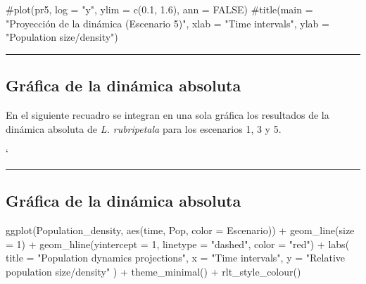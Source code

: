 \documentclass[
  12pt,
  letterpaper,
]{book}
\newenvironment{Shaded}{\begin{snugshade}}{\end{snugshade}}
\newcommand{\AttributeTok}[1]{\textcolor[rgb]{0.40,0.45,0.13}{#1}}
\newcommand{\CommentTok}[1]{\textcolor[rgb]{0.37,0.37,0.37}{#1}}
\newcommand{\DecValTok}[1]{\textcolor[rgb]{0.68,0.00,0.00}{#1}}
\newcommand{\FunctionTok}[1]{\textcolor[rgb]{0.28,0.35,0.67}{#1}}
\newcommand{\NormalTok}[1]{\textcolor[rgb]{0.00,0.23,0.31}{#1}}
\newcommand{\SpecialCharTok}[1]{\textcolor[rgb]{0.37,0.37,0.37}{#1}}
\newcommand{\StringTok}[1]{\textcolor[rgb]{0.13,0.47,0.30}{#1}}
\begin{document}
\begin{Shaded}
\begin{Highlighting}[]
\CommentTok{\#plot(pr5, log = "y", ylim = c(0.1, 1.6), ann = FALSE)}
\CommentTok{\#title(main = "Proyección de la dinámica (Escenario 5)", xlab = "Time intervals", ylab = "Population size/density")}
\end{Highlighting}
\end{Shaded}

\begin{center}\rule{0.5\linewidth}{0.5pt}\end{center}

\subsection{Gráfica de la dinámica
absoluta}\label{gruxe1fica-de-la-dinuxe1mica-absoluta}

En el siguiente recuadro se integran en una sola gráfica los resultados
de la dinámica absoluta de \emph{L. rubripetala} para los escenarios 1,
3 y 5.

`

\begin{center}\rule{0.5\linewidth}{0.5pt}\end{center}

\subsection{Gráfica de la dinámica
absoluta}\label{gruxe1fica-de-la-dinuxe1mica-absoluta-1}

\begin{Shaded}
\begin{Highlighting}[]
\FunctionTok{ggplot}\NormalTok{(Population\_density, }\FunctionTok{aes}\NormalTok{(time, Pop, }\AttributeTok{color =}\NormalTok{ Escenario)) }\SpecialCharTok{+}
  \FunctionTok{geom\_line}\NormalTok{(}\AttributeTok{size =} \DecValTok{1}\NormalTok{) }\SpecialCharTok{+}
  \FunctionTok{geom\_hline}\NormalTok{(}\AttributeTok{yintercept =} \DecValTok{1}\NormalTok{, }\AttributeTok{linetype =} \StringTok{"dashed"}\NormalTok{, }\AttributeTok{color =} \StringTok{"red"}\NormalTok{) }\SpecialCharTok{+}
  \FunctionTok{labs}\NormalTok{(}
    \AttributeTok{title =} \StringTok{"Population dynamics projections"}\NormalTok{,}
    \AttributeTok{x =} \StringTok{"Time intervals"}\NormalTok{,}
    \AttributeTok{y =} \StringTok{"Relative population size/density"}
\NormalTok{  ) }\SpecialCharTok{+}
  \FunctionTok{theme\_minimal}\NormalTok{() }\SpecialCharTok{+}
  \FunctionTok{rlt\_style\_colour}\NormalTok{()}
\end{Highlighting}
\end{Shaded}
\end{document}
